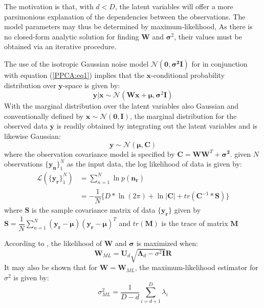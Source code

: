 \documentclass[10pt,conference,letterpaper]{IEEEtran}
\begin{document}
The motivation is that, with $d < D $, the latent variables will offer a more parsimonious explanation of the dependencies between the observations. The model parameters may thus be determined by maximum-likelihood, As there is no closed-form analytic solution for finding $\pmb{W}$ and $\pmb{\sigma}^2$, their values must be obtained via an iterative procedure.

The use of the isotropic Gaussian noise model $\mathcal{N}(\pmb{0},\pmb{\sigma^2I})$ for   in conjunction with equation (\ref{PPCA:eq1}) implies that the $\pmb{x}$-conditional probability distribution over $\pmb{y}$-space is given by:
\begin{equation}
\label{PPCA:eq2}
\pmb{y|x} \sim \mathcal{N}(\pmb{Wx}+\pmb{\mu}, \pmb{\sigma}^2\pmb{I})
\end{equation}
With the marginal distribution over the latent variables also Gaussian and conventionally defined by $\pmb{x} \sim \mathcal{N}(\pmb{0},\pmb{I})$, the marginal distribution for the observed data $\pmb{y}$ is readily obtained by integrating out the latent variables and is likewise Gaussian:
\begin{equation}
\label{PPCA:eq3}
\pmb{y} \sim \mathcal{N}(\pmb{\mu},\pmb{C})
\end{equation}
where the observation covariance model is specified by $\pmb{C}=\pmb{WW}^T+\pmb{\sigma^2}$. given $N$ observations $\{\pmb{y_n}\}^N_1$ as the input data, the log likelihood of data is given by:
\begin{align}
\label{PPCA:eq4}
{\mathcal{L}(\{ \pmb{y_r}\}^N_1)} &= \sum_{n=1}^N \ln{p(\pmb{n_r})} \nonumber \\
&= -\dfrac{1}{N}\{D*\ln(2\pi) + \ln|\pmb{C}| + tr(\pmb{C}^{-1}*\pmb{S})\}
\end{align}
where $\pmb{S}$ is the sample covariance matrix of data $\pmb{\{y_r\}}$ given by $
\pmb{S} = \dfrac{1}{N} \sum_{n=1}^N (\pmb{y_r - \mu})(\pmb{y_r - \mu})^T$ and $tr(\pmb{M})$ is the trace of matrix $\pmb{M}$

According to \cite{bishop}, the likelihood of $\pmb{W}$ and $\pmb{\sigma}$ is maximized when:
\begin{equation}
\label{PPCA:eq7}
\pmb{W}_{ML} = \pmb{U}_d \sqrt{\pmb{\Lambda}_d - \sigma^2\pmb{I}}\pmb{R}
\end{equation}
It may also be shown that for $\pmb{W} = \pmb{W}_{ML}$, the maximum-likelihood estimator for $\sigma^2$ is given by:
\begin{equation}
\label{PPCA:eq8}
\sigma^2_{ML} = \dfrac{1}{D - d} \sum_{i=d+1}^D \lambda_i
\end{equation}
\end{document}
